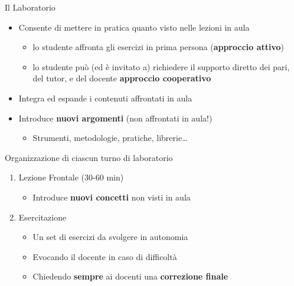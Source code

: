 \documentclass[xcolor=dvipsnames,presentation]{beamer}
\begin{document}
\begin{frame}{Il Laboratorio}

\begin{itemize}
    \item Consente di mettere in pratica quanto visto nelle lezioni in aula
    \begin{itemize}
    	\item lo studente affronta gli esercizi in prima persona (\textbf{approccio attivo}) 
        \item lo studente può (ed è invitato a) richiedere il supporto diretto dei pari, del tutor, e del docente \textbf{approccio cooperativo}
    \end{itemize}
    \item Integra ed espande i contenuti affrontati in aula
    \item Introduce \textbf{nuovi argomenti} (non affrontati in aula!)
    \begin{itemize}
        \item Strumenti, metodologie, pratiche, librerie\dots{}
    \end{itemize}
\end{itemize}

\begin{block}{Organizzazione di ciascun turno di laboratorio}
    \begin{enumerate}
        \item Lezione Frontale (30-60 min)
        \begin{itemize}
            \item Introduce \textbf{nuovi concetti} non visti in aula
        \end{itemize}
        \item Esercitazione
        \begin{itemize}
            \item Un set di esercizi da svolgere in autonomia
            \item Evocando il docente in caso di difficoltà
            \item Chiedendo \textbf{sempre} ai docenti una \textbf{correzione finale}
        \end{itemize}
    \end{enumerate}
\end{block}
\end{frame}
\end{document}
